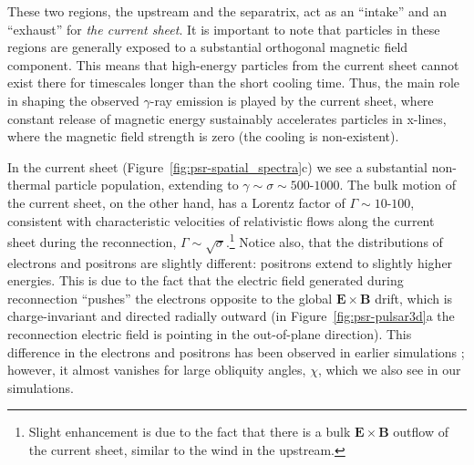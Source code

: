 These two regions, the upstream and the separatrix, act as an ``intake'' and an ``exhaust'' for \emph{the current sheet}. It is important to note that particles in these regions are generally exposed to a substantial orthogonal magnetic field component. This means that high-energy particles from the current sheet cannot exist there for timescales longer than the short cooling time. Thus, the main role in shaping the observed $\gamma$-ray emission is played by the current sheet, where constant release of magnetic energy sustainably accelerates particles in x-lines, where the magnetic field strength is zero (the cooling is non-existent).

In the current sheet (Figure~\ref{fig:psr-spatial_spectra}c) we see a substantial non-thermal particle population, extending to $\gamma\sim \sigma\sim 500\text{-}1000$. The bulk motion of the current sheet, on the other hand, has a Lorentz factor of $\Gamma\sim 10\text{-}100$, consistent with characteristic velocities of relativistic flows along the current sheet during the reconnection, $\Gamma\sim \sqrt{\sigma}$.\footnote{Slight enhancement is due to the fact that there is a bulk $\bm{E}\times\bm{B}$ outflow of the current sheet, similar to the wind in the upstream.} Notice also, that the distributions of electrons and positrons are slightly different: positrons extend to slightly higher energies. This is due to the fact that the electric field generated during reconnection ``pushes'' the electrons opposite to the global $\bm{E}\times\bm{B}$ drift, which is charge-invariant and directed radially outward (in Figure~\ref{fig:psr-pulsar3d}a the reconnection electric field is pointing in the out-of-plane direction). This difference in the electrons and positrons has been observed in earlier simulations \citep[see, e.g.,][]{PSAS18}; however, it almost vanishes for large obliquity angles, $\chi$, which we also see in our simulations.

